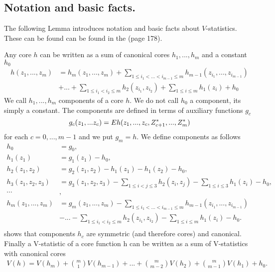 \subsection{Notation and basic facts.}
\label{sec:basicNotationandFacts}

The following Lemma introduces notation and basic facts about $V$-statistics. These can be found can be found in the \cite[Section 5.1.5]{serfling80} (page 178). 
\begin{lemma}
\label{lem:Components}\cite[Section 5.1.5]{serfling80}
Any core $h$ can be written as a sum of canonical cores $h_1,...,h_m$ and a constant $h_0$
\begin{align*}
h(z_1,...,z_m) &=   h_m(z_1,...,z_m) + \sum_{1 \leq i_1 < ...<i_{m-1} \leq m } h_{m-1}(z_{i_1},...,z_{i_{m-1}}) \\ 
    & + ... + \sum_{1 \leq i_1 < i_2 \leq m } h_2(z_{i_1},z_{i_2}) + \sum_{1 \leq i \leq m} h_1(z_i)+h_0
\end{align*} 
We call $h_1,...,h_m$ components of a core $h$. We do not call $h_0$ a component, its simply a constant. The components are defined in terms of auxiliary functions $g_c$
\[
 g_c(z_1,...z_c) = E h(z_1,...,z_c,Z_{c+1}^*,...,Z_{m}^*)
\]
for each $c=0,...,m-1$ and we put $g_m=h$. We define components as follows
\begin{align}
   h_0 &= g_0, \\  
   h_1(z_1) &= g_1(z_1) -h_0,\\
   h_2(z_1,z_2) &= g_2(z_1,z_2)  - h_1(z_1) - h_1(z_2)-h_0, \\  
   h_3(z_1,z_2,z_3) &= g_3(z_1,z_2,z_3) - \sum_{1 \leq i < j \leq 3 } h_2(z_i,z_j) - \sum_{1\leq i \leq 3} h_1(z_i)-h_0, \\ 
   \cdots &, \\
   h_m(z_1,...,z_m) &= g_m(z_1,...,z_m) - \sum_{1 \leq i_1 < ...<i_{m-1} \leq m } h_{m-1}(z_{i_1},...,z_{i_{m-1}}) \\ 
    & - ... - \sum_{1 \leq i_1 < i_2 \leq m } h_2(z_{i_1},z_{i_2}) - \sum_{1 \leq i \leq m} h_1(z_i)-h_0.\\
\end{align}
\cite[Section 5.1.5]{serfling80} shows that components $h_c$ are symmetric (and therefore cores) and canonical.  Finally a V-statistic of a core function h can be written as a sum of  V-statistics with canonical cores
\begin{align}
  V(h) = V(h_m) + \binom m 1 V(h_{m-1}) + ...+ \binom {m} {m-2} V(h_{2}) + \binom {m} {m-1} V(h_{1}) + h_0.
 \end{align}
\end{lemma}

